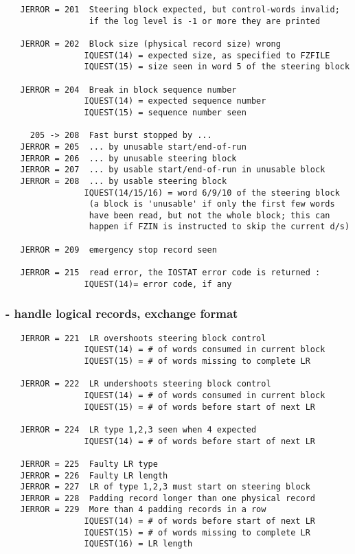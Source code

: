 \begin{verbatim}
   JERROR = 201  Steering block expected, but control-words invalid;
                 if the log level is -1 or more they are printed

   JERROR = 202  Block size (physical record size) wrong
                IQUEST(14) = expected size, as specified to FZFILE
                IQUEST(15) = size seen in word 5 of the steering block

   JERROR = 204  Break in block sequence number
                IQUEST(14) = expected sequence number
                IQUEST(15) = sequence number seen

     205 -> 208  Fast burst stopped by ...
   JERROR = 205  ... by unusable start/end-of-run
   JERROR = 206  ... by unusable steering block
   JERROR = 207  ... by usable start/end-of-run in unusable block
   JERROR = 208  ... by usable steering block
                IQUEST(14/15/16) = word 6/9/10 of the steering block
                 (a block is 'unusable' if only the first few words
                 have been read, but not the whole block; this can
                 happen if FZIN is instructed to skip the current d/s)

   JERROR = 209  emergency stop record seen

   JERROR = 215  read error, the IOSTAT error code is returned :
                IQUEST(14)= error code, if any
\end{verbatim}

\subsubsection*{ - handle logical records, exchange format}

\begin{verbatim}
   JERROR = 221  LR overshoots steering block control
                IQUEST(14) = # of words consumed in current block
                IQUEST(15) = # of words missing to complete LR

   JERROR = 222  LR undershoots steering block control
                IQUEST(14) = # of words consumed in current block
                IQUEST(15) = # of words before start of next LR

   JERROR = 224  LR type 1,2,3 seen when 4 expected
                IQUEST(14) = # of words before start of next LR

   JERROR = 225  Faulty LR type
   JERROR = 226  Faulty LR length
   JERROR = 227  LR of type 1,2,3 must start on steering block
   JERROR = 228  Padding record longer than one physical record
   JERROR = 229  More than 4 padding records in a row
                IQUEST(14) = # of words before start of next LR
                IQUEST(15) = # of words missing to complete LR
                IQUEST(16) = LR length
\end{verbatim}

